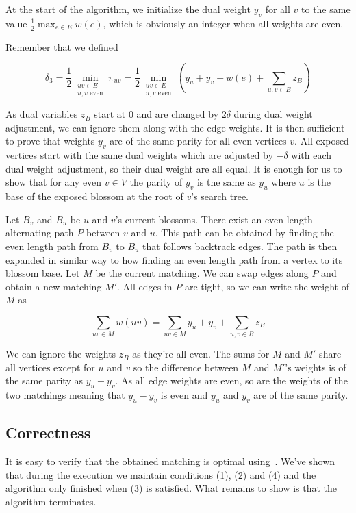 At the start of the algorithm, we initialize the dual weight $y_v$ for all $v$ to the same value $\frac{1}{2}\max_{e \in E} w(e)$, which is obviously an integer when all weights are even.

Remember that we defined

\[\delta_3=\frac{1}{2}\min_{\substack{uv\in E \\ \text{$u, v$ even}}} \pi_{uv} = \frac{1}{2}\min_{\substack{uv\in E \\ \text{$u, v$ even}}} \left(y_u + y_v - w(e) + \sum_{u, v \in B} z_B\right)\] 

As dual variables $z_B$ start at $0$ and are changed by $2\delta$ during dual weight adjustment, we can ignore them along with the edge weights. It is then sufficient to prove that weights $y_v$ are of the same parity for all even vertices $v$. All exposed vertices start with the same dual weights which are adjusted by $-\delta$ with each dual weight adjustment, so their dual weight are all equal. It is enough for us to show that for any even $v \in V$ the parity of $y_v$ is the same as $y_u$ where $u$ is the base of the exposed blossom at the root of $v$'s search tree. 

Let $B_v$ and $B_u$ be $u$ and $v$'s current blossoms. There exist an even length alternating path $P$ between $v$ and $u$. This path can be obtained by finding the even length path from $B_v$ to $B_u$ that follows backtrack edges. The path is then expanded in similar way to how finding an even length path from a vertex to its blossom base. Let $M$ be the current matching. We can swap edges along $P$ and obtain a new matching $M'$. All edges in $P$ are tight, so we can write the weight of $M$ as

\[\sum_{uv \in M} w(uv) = \sum_{uv \in M} y_u + y_v + \sum_{u, v \in B} z_B\]

We can ignore the weights $z_B$ as they're all even. The sums for $M$ and $M'$ share all vertices except for $u$ and $v$ so the difference between $M$ and $M'$'s weights is of the same parity as $y_u - y_v$. As all edge weights are even, so are the weights of the two matchings meaning that $y_u - y_v$ is even and $y_u$ and $y_v$ are of the same parity.

\subsection{Correctness}

It is easy to verify that the obtained matching is optimal using~. We've shown that during the execution we maintain conditions (1), (2) and (4) and the algorithm only finished when (3) is satisfied. What remains to show is that the algorithm terminates.

